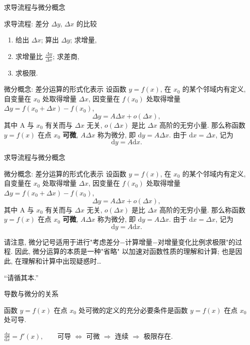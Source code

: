 \documentclass[
10pt,
aspectratio=43,
]{beamer}
\begin{document}
\begin{frame}{求导流程与微分概念}
	\begin{block}{求导流程: 差分 $\Delta y$, $\Delta x$ 的比较}
		\begin{enumerate}
			\pause\item 	给出 $\Delta x$; 算出 $\Delta y$; 求增量,
			      \pause\item  	求增量比 $\frac{\Delta y}{\Delta x}$; 求差商,
			      \pause\item  	求极限.
		\end{enumerate}
	\end{block}
	\pause
	\begin{block}{微分概念: 差分运算的形式化表示}
		设函数 $y=f(x)$, 在 $x_0$ 的某个邻域内有定义, 自变量在 $x_0$ 处取得增量 $\Delta x$, 因变量在 $f(x_0)$ 处取得增量 $\Delta y=f\left(x_0+\Delta x\right)-f\left(x_0\right)$,
		$$
			\Delta y=A \Delta x+o(\Delta x),
		$$
		其中 $\mathrm{A}$ 与 $x_0$ 有关而与 $\Delta x$ 无关, $o(\Delta x)$ 是比 $\Delta x$ 高阶的无穷小量. 那么称函数 $y=f(x)$ 在点 $x_0$ {\bf 可微}, $A \Delta x$ 称为微分, 即 $\mathrm{d} y=A \Delta x$. 由于 $\mathrm{d} x = \Delta x$, 记为
		$$
			\mathrm{d}y = A \mathrm{d}x.
		$$
	\end{block}
\end{frame}

\begin{frame}{求导流程与微分概念}
	\begin{block}{微分概念: 差分运算的形式化表示}
		设函数 $y=f(x)$, 在 $x_0$ 的某个邻域内有定义, 自变量在 $x_0$ 处取得增量 $\Delta x$, 因变量在 $f(x_0)$ 处取得增量 $\Delta y=f\left(x_0+\Delta x\right)-f\left(x_0\right)$,
		$$
			\Delta y=A \Delta x+o(\Delta x),
		$$
		其中 $\mathrm{A}$ 与 $x_0$ 有关而与 $\Delta x$ 无关, $o(\Delta x)$ 是比 $\Delta x$ 高阶的无穷小量. 那么称函数 $y=f(x)$ 在点 $x_0$ {\bf 可微}, $A \Delta x$ 称为微分, 即 $\mathrm{d} y=A \Delta x$. 由于 $\mathrm{d} x = \Delta x$, 记为
		$$
			\mathrm{d}y = A \mathrm{d}x.
		$$
	\end{block}
	\pause
	请注意, 微分记号适用于进行"考虑差分$-$计算增量$-$对增量变化比例求极限"的过程. 因此, 微分运算的本质是一种"省略" 以加速对函数性质的理解和计算; 也是因此, 在理解和计算中出现疑惑时\dots
	\pause
	\begin{exampleblock}{}
		{\large ``请循其本.''}
		\hspace*{}
	\end{exampleblock}
\end{frame}

\begin{frame}{导数与微分的关系}
	\begin{theorem}
		函数 $y=f(x)$ 在点 $x_0$ 处可微的定义的充分必要条件是函数 $y=f(x)$ 在点 $x_0$ 处可导.
	\end{theorem}{}
	\bigskip\bigskip\pause
	\begin{exampleblock}{}
		\begin{center}
			$\displaystyle\frac{\mathrm{d}y}{\mathrm{d}x}=f'(x),\qquad$可导 $\Longleftrightarrow$ 可微 $\Rightarrow$ 连续 $\Rightarrow$ 极限存在.
		\end{center}
	\end{exampleblock}

\end{frame}
\end{document}

